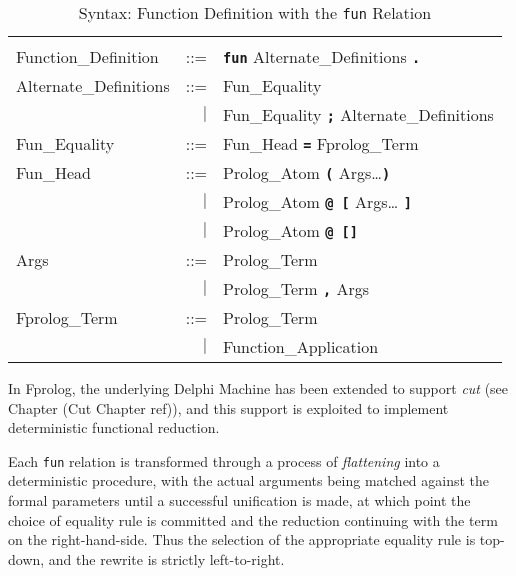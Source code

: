 \documentclass[a4paper,11pt,twoside]{article}
\begin{document}
\begin{table}[htbp]
{\small
\begin{tabular}{|l r l|}
\hline
 & &\\[2mm]
Function\_{}Definition & ::= & \texttt{\textbf{fun}}
                               Alternate\_{}Definitions
                               \texttt{\textbf{.}}\\[4mm]

Alternate\_{}Definitions & ::= & Fun\_{}Equality\\
                      & $|$ & Fun\_{}Equality \texttt{\textbf{;}}
                              Alternate\_{}Definitions\\[4mm]

Fun\_{}Equality  & ::= & Fun\_{}Head \texttt{\textbf{=}} Fprolog\_{}Term\\[4mm]

Fun\_{}Head      & ::= & Prolog\_{}Atom \texttt{\textbf{(}} Args\ldots \texttt{\textbf{)}}\\
                 &  $|$  & Prolog\_{}Atom \texttt{\textbf{@ [}} Args\ldots
                            \texttt{\textbf{]}}\\
                 &  $|$  & Prolog\_{}Atom \texttt{\textbf{@ []}}\\[4mm]

Args             & ::= & Prolog\_{}Term\\
                 &   $|$ & Prolog\_{}Term \texttt{\textbf{,}} Args\\[4mm]

Fprolog\_{}Term & ::= & Prolog\_{}Term\\
                 & $|$ & Function\_{}Application\\[4mm]
 
\hline
\end{tabular}
}
\caption{Syntax: Function Definition with the \texttt{fun} Relation}
\label{syntax:fun}
\end{table}

In Fprolog, the underlying Delphi Machine has been extended to support \textit{cut}
(see Chapter (Cut Chapter ref)), and this support is exploited to implement deterministic 
functional reduction.

Each \texttt{fun} relation is transformed through a process of \textit{flattening}
\cite{CF93} into a deterministic procedure, with the actual arguments being
matched against the formal parameters until a successful unification is made, at which
point the choice of equality rule is committed and the reduction continuing with the
term on the right-hand-side.
Thus the selection of the appropriate equality rule is top-down, and the rewrite
is strictly left-to-right.
\end{document}
